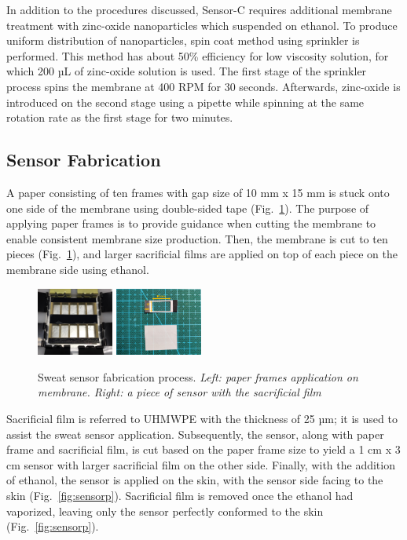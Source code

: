 \documentclass[journal]{IEEEtran}
\begin{document}
In addition to the procedures discussed, Sensor-C requires additional membrane treatment with zinc-oxide nanoparticles which suspended on ethanol. To produce uniform distribution of nanoparticles, spin coat method using sprinkler is performed. This method has about 50\% efficiency for low viscosity solution, for which 200 µL of zinc-oxide solution is used. The first stage of the sprinkler process spins the membrane at 400 RPM for 30 seconds. Afterwards, zinc-oxide is introduced on the second stage using a pipette while spinning at the same rotation rate as the first stage for two minutes. 

\subsection{Sensor Fabrication}

A paper consisting of ten frames with gap size of 10 mm x 15 mm is stuck onto one side of the membrane using double-sided tape (Fig.~\ref{fig:sensor_fabrication}). The purpose of applying paper frames is to provide guidance when cutting the membrane to enable consistent membrane size production. Then, the membrane is cut to ten pieces (Fig.~\ref{fig:sensor_fabrication}), and larger sacrificial films are applied on top of each piece on the membrane side using ethanol. 

\begin{figure}[H]
\begin{center}
\includegraphics[width=0.225\textwidth]{images/frame.jpg}
\includegraphics[width=0.255\textwidth]{images/membrane_green.png}
\caption{Sweat sensor fabrication process. \textit{Left: paper frames application on membrane. Right: a piece of sensor with the sacrificial film}} \label{fig:sensor_fabrication}
\end{center}
\end{figure}

Sacrificial film is referred to UHMWPE with the thickness of 25 µm; it is used to assist the sweat sensor application. Subsequently, the sensor, along with paper frame and sacrificial film, is cut based on the paper frame size to yield a 1 cm x 3 cm sensor with larger sacrificial film on the other side. Finally, with the addition of ethanol, the sensor is applied on the skin, with the sensor side facing to the skin (Fig.~\ref{fig:sensorp}). Sacrificial film is removed once the ethanol had vaporized, leaving only the sensor perfectly conformed to the skin (Fig.~\ref{fig:sensorp}).
\end{document}
